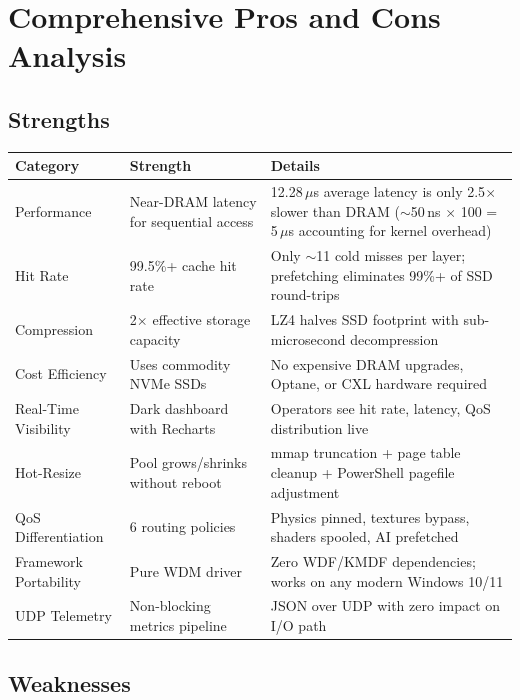 \documentclass[11pt,a4paper]{article}
\newcommand{\micro}{$\mu$}
\begin{document}
\section{Comprehensive Pros and Cons Analysis}
\label{sec:proscons}

\subsection{Strengths}

\begin{longtable}{p{3cm}p{3.5cm}p{7cm}}
\toprule
\textbf{Category} & \textbf{Strength} & \textbf{Details} \\
\midrule
\endhead
Performance & Near-DRAM latency for sequential access & 12.28\,\micro{}s average latency is only 2.5$\times$ slower than DRAM ($\sim$50\,ns $\times$ 100 = 5\,\micro{}s accounting for kernel overhead) \\
Hit Rate & 99.5\%+ cache hit rate & Only $\sim$11 cold misses per layer; prefetching eliminates 99\%+ of SSD round-trips \\
Compression & 2$\times$ effective storage capacity & LZ4 halves SSD footprint with sub-microsecond decompression \\
Cost Efficiency & Uses commodity NVMe SSDs & No expensive DRAM upgrades, Optane, or CXL hardware required \\
Real-Time Visibility & Dark dashboard with Recharts & Operators see hit rate, latency, QoS distribution live \\
Hot-Resize & Pool grows/shrinks without reboot & mmap truncation + page table cleanup + PowerShell pagefile adjustment \\
QoS Differentiation & 6 routing policies & Physics pinned, textures bypass, shaders spooled, AI prefetched \\
Framework Portability & Pure WDM driver & Zero WDF/KMDF dependencies; works on any modern Windows 10/11 \\
UDP Telemetry & Non-blocking metrics pipeline & JSON over UDP with zero impact on I/O path \\
\bottomrule
\end{longtable}

\subsection{Weaknesses}
\end{document}
